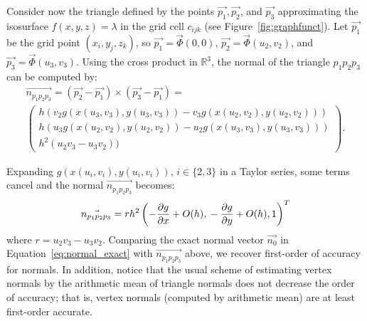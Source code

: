 Consider now the triangle defined by the points $\vec{p_1},\vec{p_2}$, and $\vec{p_3}$ 
approximating the isosurface
$f(x,y,z)=\lambda$ in the grid cell $c_{ijk}$ (see Figure~\ref{fig:graphfunct}).
Let $\vec{p_1}$ be the grid point $(x_i,y_j,z_k)$, so $\vec{p_1}=\vec{\Phi}(0,0),\, \vec{p_2}=\vec{\Phi}(u_2,v_2)$, and $\vec{p_3} = \vec{\Phi}(u_3,v_3)$. 
Using the cross product in $\mathbb{R}^3$, 
the normal of the triangle $p_1p_2p_3$ can be computed by:
\begin{equation}
\begin{array}{c}
\displaystyle{\vec{n_{p_1p_2p_3}}\!\! =\!\! (\vec{p_2} - \vec{p_1})\times(\vec{p_3} - \vec{p_1})\!\! =} \\
\displaystyle{\left(\!\!\!\!\!\begin{array}{c}
h(v_2g(x(u_3,v_3),y(u_3,v_3)) - v_3g(x(u_2,v_2),y(u_2,v_2)))\\
h(u_3g(x(u_2,v_2),y(u_2,v_2)) - u_2g(x(u_3,v_3),y(u_3,v_3)))\\
h^2(u_2v_3-u_3v_2))
\end{array}\!\!\!\!\!\right).}
\end{array}
\label{eq:normal_tri1}
\end{equation}

Expanding $g(x(u_i,v_i),y(u_i,v_i)),\, i \in \{2,3\}$ in a Taylor
series, some terms cancel and the normal $\vec{n_{p_1p_2p_3}}$ becomes:
\begin{equation}
\vec{n_{p_1p_2p_3}} = rh^2
\left(
-\frac{\partial g}{\partial x} + O(h),\\
-\frac{\partial g}{\partial y} + O(h),\\ 
 1\right)^T
\label{eq:normal_tri2}
\end{equation}
where $r = u_2v_3-u_3v_2$. 
Comparing the exact normal vector $\vec{n_0}$ in Equation~\ref{eq:normal_exact} with
$\vec{n_{p_1p_2p_3}}$ above, we recover first-order of accuracy for normals. 
In addition, notice that the usual scheme of estimating vertex 
normals by the arithmetic mean of triangle normals
does not decrease the order of accuracy; that is, vertex 
normals (computed by arithmetic mean) are at least first-order accurate.

